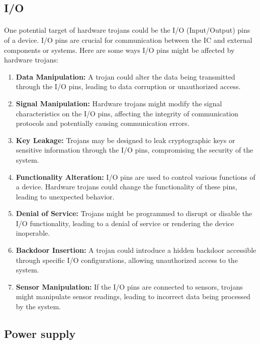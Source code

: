 \subsection{I/O}
\paragraph*{}
One potential target of hardware trojans could be the I/O (Input/Output) pins of a device. I/O pins are crucial for communication between the IC and external components or systems. Here are some ways I/O pins might be affected by hardware trojans:
\begin{enumerate}
	\item \textbf{Data Manipulation:} A trojan could alter the data being transmitted through the I/O pins, leading to data corruption or unauthorized access.
	\item \textbf{Signal Manipulation:} Hardware trojans might modify the signal characteristics on the I/O pins, affecting the integrity of communication protocols and potentially causing communication errors.
	\item \textbf{Key Leakage:} Trojans may be designed to leak cryptographic keys or sensitive information through the I/O pins, compromising the security of the system.
	\item \textbf{Functionality Alteration:} I/O pins are used to control various functions of a device. Hardware trojans could change the functionality of these pins, leading to unexpected behavior.
	\item \textbf{Denial of Service:} Trojans might be programmed to disrupt or disable the I/O functionality, leading to a denial of service or rendering the device inoperable.
	\item \textbf{Backdoor Insertion:} A trojan could introduce a hidden backdoor accessible through specific I/O configurations, allowing unauthorized access to the system.
	\item \textbf{Sensor Manipulation:} If the I/O pins are connected to sensors, trojans might manipulate sensor readings, leading to incorrect data being processed by the system.
\end{enumerate} 
\subsection{Power supply}
